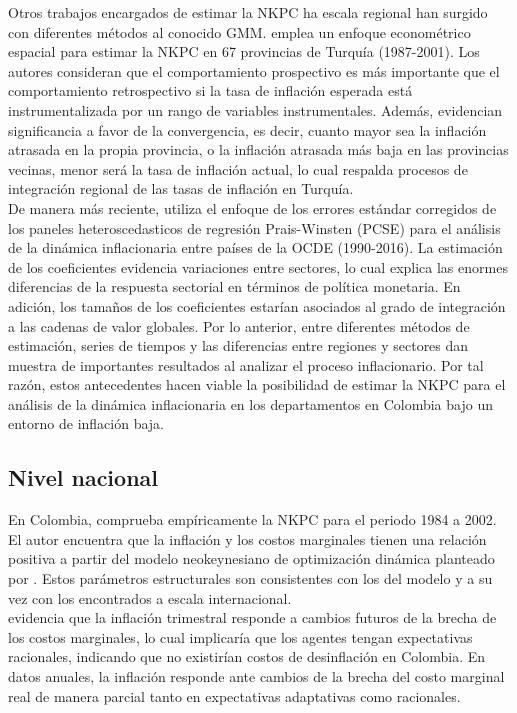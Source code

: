 Otros trabajos encargados de estimar la NKPC ha escala regional han surgido con diferentes métodos al conocido GMM. \cite{yesilyurt2014regional} emplea un enfoque econométrico espacial  para estimar la NKPC en 67 provincias de Turquía (1987-2001). Los autores consideran que el comportamiento prospectivo es más importante que el comportamiento retrospectivo  si la tasa de inflación esperada está instrumentalizada por un rango de variables instrumentales. Además, evidencian significancia a favor de la convergencia, es decir, cuanto mayor sea la inflación atrasada en la propia provincia, o la inflación atrasada más baja en las provincias vecinas, menor será la tasa de inflación actual, lo cual respalda  procesos de integración regional de las tasas de inflación en Turquía. \\

De manera más reciente, \cite{saygili2020sectoral}  utiliza el enfoque de los errores estándar corregidos de los paneles heteroscedasticos de regresión Prais-Winsten (PCSE) para el análisis de la dinámica inflacionaria entre países de la OCDE (1990-2016). La estimación de los coeficientes evidencia variaciones entre sectores, lo cual explica las enormes diferencias de la respuesta sectorial en términos de política monetaria. En adición, los tamaños de los coeficientes estarían asociados al grado de integración a las cadenas de valor globales. Por lo anterior, entre diferentes métodos de estimación, series de tiempos y las diferencias entre regiones y sectores  dan muestra de importantes resultados al analizar el proceso inflacionario.  Por tal razón, estos antecedentes hacen viable la posibilidad de estimar la NKPC  para el análisis de la dinámica inflacionaria en los departamentos en Colombia bajo un entorno de inflación baja.

\subsection{Nivel nacional}
En Colombia,  \cite{bejarano2005estimacion} comprueba empíricamente la NKPC para el periodo 1984 a 2002. El autor encuentra que la inflación y los costos marginales tienen una relación positiva a partir del modelo neokeynesiano de optimización dinámica planteado por \cite{gali1999inflation}. Estos parámetros estructurales son consistentes con los del modelo y a su vez con los encontrados a escala internacional.\\

\cite{bejarano2005estimacion} evidencia que la inflación trimestral responde a cambios futuros de la brecha de los costos marginales, lo cual implicaría que los agentes tengan expectativas  racionales, indicando que no existirían costos de desinflación en Colombia. En datos anuales, la inflación responde ante cambios de la brecha del costo marginal real de manera parcial tanto en expectativas adaptativas como racionales.\\

